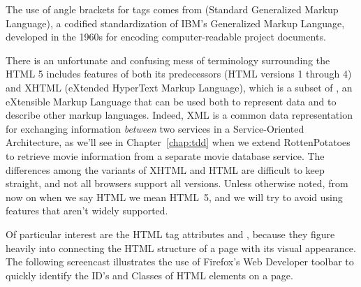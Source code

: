   \begin{sidebar}{}%
  The use of angle brackets for tags
  comes from  (Standard Generalized Markup Language),
  a codified standardization of IBM's Generalized Markup
  Language, developed  in the 1960s for encoding
  computer-readable project documents.
  \end{sidebar}

There is an unfortunate and confusing mess of terminology surrounding the
HTML 5 includes features of both its predecessors
(HTML versions 1 through 4) and XHTML
(eXtended HyperText Markup Language),
which is a subset of , an eXtensible Markup Language
that can be used both to represent data and to describe other markup
languages.  Indeed, XML is a common data representation for exchanging
information \emph{between} two services in a Service-Oriented
Architecture,
as we'll see in
Chapter~\ref{chap:tdd} when we extend RottenPotatoes to retrieve
movie information from a separate movie database service.  The
differences among the variants of XHTML and HTML are difficult to keep
straight, and not all browsers support all versions.  Unless otherwise
noted, from now on when we say HTML we mean
HTML~5, and we will try to avoid using features that aren't widely
supported.


Of particular interest are the HTML tag attributes  and ,
because they figure heavily into connecting the HTML structure of a
page with its visual appearance.  The
following screencast illustrates the use of Firefox's Web Developer
toolbar to quickly identify the ID's and Classes of HTML elements on a
page.

